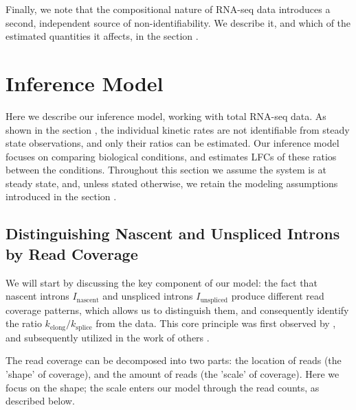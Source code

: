 \documentclass[11pt]{article}
\begin{document}
    Finally, we note that the compositional nature of RNA-seq data introduces a second, independent source of non-identifiability. We describe it, and which of the estimated quantities it affects, in the section .


    \section{Inference Model} \label{inference_model}
    Here we describe our inference model, working with total RNA-seq data. As shown in the section , the individual kinetic rates are not identifiable from steady state observations, and only their ratios can be estimated. Our inference model focuses on comparing biological conditions, and estimates LFCs of these ratios between the conditions. Throughout this section we assume the system is at steady state, and, unless stated otherwise, we retain the modeling assumptions introduced in the section .
    
    \subsection{Distinguishing Nascent and Unspliced Introns by Read Coverage} \label{subsec:coverage_shape}
    
    We will start by discussing the key component of our model: the fact that nascent introns $I_{\mathrm{nascent}}$ and unspliced introns $I_{\mathrm{unspliced}}$ produce different read coverage patterns, which allows us to distinguish them, and consequently identify the ratio $k_\mathrm{elong} / k_\mathrm{splice}$ from the data. This core principle was first observed by \citet{ameurTotalRNASequencing2011}, and subsequently utilized in the work of others \citep{jonkersGenomewideDynamicsPol2014, graySnapShotSeqMethodExtracting2014, kawamuraStatisticalInferenceRate2019, debesAgeingassociatedChangesTranscriptional2023}.
    
    The read coverage can be decomposed into two parts: the location of reads (the 'shape' of coverage), and the amount of reads (the 'scale' of coverage). Here we focus on the shape; the scale enters our model through the read counts, as described below.
\end{document}
